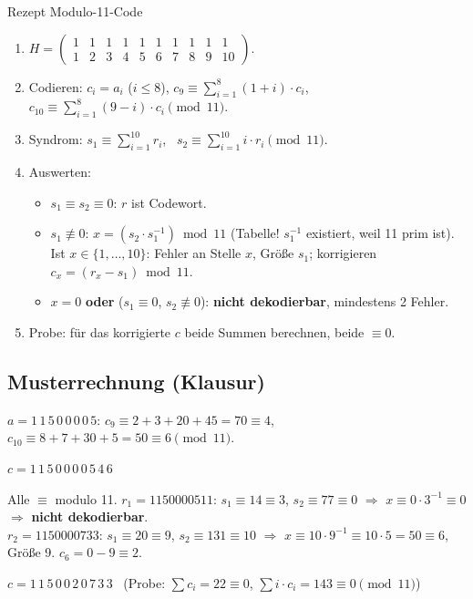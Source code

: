 \begin{rezept}{Rezept Modulo-11-Code}
\begin{enumerate}
\item $H = \begin{pmatrix} 1&1&1&1&1&1&1&1&1&1\\ 1&2&3&4&5&6&7&8&9&10 \end{pmatrix}$.
\item Codieren: $c_i = a_i$ ($i \le 8$), $c_9 \equiv \sum_{i=1}^{8} (1+i) \cdot c_i$, \ $c_{10} \equiv \sum_{i=1}^{8} (9-i) \cdot c_i \pmod{11}$.
\item Syndrom: $s_1 \equiv \sum_{i=1}^{10} r_i$, \ $s_2 \equiv \sum_{i=1}^{10} i \cdot r_i \pmod{11}$.
\item Auswerten:
  \begin{itemize}
  \item $s_1 \equiv s_2 \equiv 0$: $r$ ist Codewort.
  \item $s_1 \not\equiv 0$: $x = (s_2 \cdot s_1^{-1}) \bmod 11$ (Tabelle! $s_1^{-1}$ existiert, weil 11 prim ist). Ist $x \in \{1, \dots, 10\}$: Fehler an Stelle $x$, Größe $s_1$;
        korrigieren $c_x = (r_x - s_1) \bmod 11$.
  \item $x = 0$ \textbf{oder} ($s_1 \equiv 0$, $s_2 \not\equiv 0$): \textbf{nicht dekodierbar}, mindestens 2 Fehler.
  \end{itemize}
\item Probe: für das korrigierte $c$ beide Summen berechnen, beide $\equiv 0$.
\end{enumerate}
\end{rezept}

\subsection*{Musterrechnung (Klausur)}
$a = 1\,1\,5\,0\,0\,0\,0\,5$: $c_9 \equiv 2 + 3 + 20 + 45 = 70 \equiv 4$, \ $c_{10} \equiv 8 + 7 + 30 + 5 = 50 \equiv 6 \pmod{11}$.
\begin{ergebnis} $c = 1\,1\,5\,0\,0\,0\,0\,5\,4\,6$ \end{ergebnis}
Alle $\equiv$ modulo 11. $r_1 = 1150000511$: $s_1 \equiv 14 \equiv 3$, $s_2 \equiv 77 \equiv 0$ $\Rightarrow$ $x \equiv 0 \cdot 3^{-1} \equiv 0$ $\Rightarrow$ \textbf{nicht dekodierbar}.\\
$r_2 = 1150000733$: $s_1 \equiv 20 \equiv 9$, $s_2 \equiv 131 \equiv 10$ $\Rightarrow$ $x \equiv 10 \cdot 9^{-1} \equiv 10 \cdot 5 = 50 \equiv 6$, Größe 9.
$c_6 = 0 - 9 \equiv 2$.
\begin{ergebnis} $c = 1\,1\,5\,0\,0\,2\,0\,7\,3\,3$ \ (Probe: $\sum c_i = 22 \equiv 0$, $\sum i \cdot c_i = 143 \equiv 0 \pmod{11}$) \end{ergebnis}

